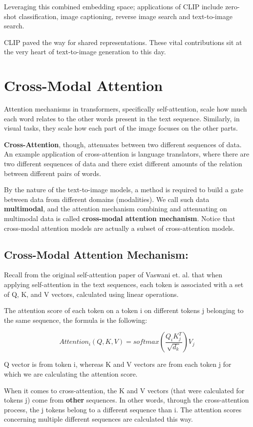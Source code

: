 \documentclass{article}
\begin{document}
Leveraging this combined embedding space; applications of CLIP include zero-shot classification, image captioning, reverse image search and text-to-image search.

CLIP paved the way for shared representations. These vital contributions sit at the very heart of text-to-image generation to this day.

\section{Cross-Modal Attention}

Attention mechanisms in transformers, specifically self-attention, scale how much each word relates to the other words present in the text sequence. Similarly, in visual tasks, they scale how each part of the image focuses on the other parts.

\textbf{Cross-Attention}, though, attenuates between two different sequences of data. An example application of cross-attention is language translators, where there are two different sequences of data and there exist different amounts of the relation between different pairs of words.

By the nature of the text-to-image models, a method is required to build a gate between data from different domains (modalities). We call such data \textbf{multimodal}, and the attention mechanism combining and attenuating on multimodal data is called \textbf{cross-modal attention mechanism}. Notice that cross-modal attention models are actually a subset of cross-attention models.

\subsection{Cross-Modal Attention Mechanism:} 
Recall from the original self-attention paper of Vaswani et. al. that when applying self-attention in the text sequences, each token is associated with a set of Q, K, and V vectors, calculated using linear operations. 

The attention score of each token on a token i on different tokens j belonging to the same sequence, the formula is the following:

\[Attention_i(Q, K, V) = softmax(\frac{Q_iK_j^T}{\sqrt{d_k}})V_j\]

Q vector is from token i, whereas K and V vectors are from each token j for which we are calculating the attention score.

When it comes to cross-attention, the K and V vectors (that were calculated for tokens j) come from \textbf{other} sequences. In other words, through the cross-attention process, the j tokens belong to a different sequence than i. The attention scores concerning multiple different sequences are calculated this way. 
\end{document}
